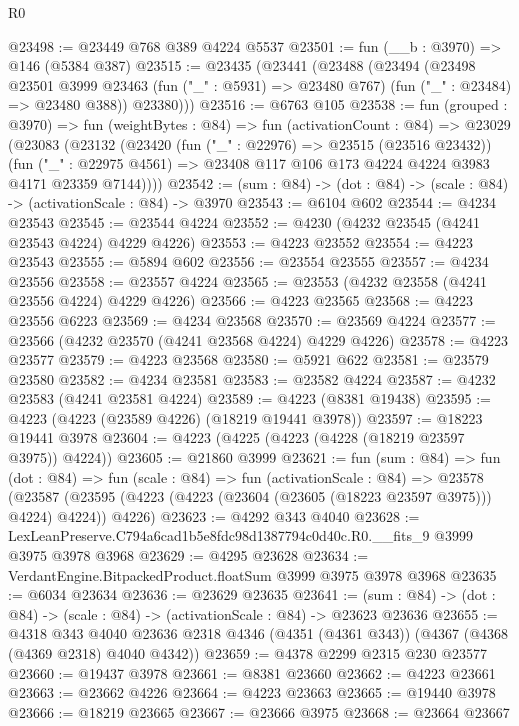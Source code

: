 \begin{lexlean}{R0}
\begin{coremodule}
@23498 := @23449 @768 @389 @4224 @5537
@23501 := fun (__b : @3970) => @146 (@5384 @387)
@23515 := @23435
    (@23441
      (@23488
        (@23494
          (@23498
            @23501
            @3999
            @23463
            (fun ("_" : @5931) => @23480 @767)
            (fun ("_" : @23484) => @23480 @388))
          @23380)))
@23516 := @6763 @105
@23538 := fun (grouped : @3970) =>
  fun (weightBytes : @84) =>
  fun (activationCount : @84) =>
  @23029
    (@23083
      (@23132
        (@23420
          (fun ("_" : @22976) => @23515 (@23516 @23432))
          (fun ("_" : @22975 @4561) =>
          @23408 @117 @106 @173 @4224 @4224 @3983 @4171 @23359 @7144))))
@23542 := (sum : @84) -> (dot : @84) -> (scale : @84) -> (activationScale : @84) -> @3970
@23543 := @6104 @602
@23544 := @4234 @23543
@23545 := @23544 @4224
@23552 := @4230 (@4232 @23545 (@4241 @23543 @4224) @4229 @4226)
@23553 := @4223 @23552
@23554 := @4223 @23543
@23555 := @5894 @602
@23556 := @23554 @23555
@23557 := @4234 @23556
@23558 := @23557 @4224
@23565 := @23553 (@4232 @23558 (@4241 @23556 @4224) @4229 @4226)
@23566 := @4223 @23565
@23568 := @4223 @23556 @6223
@23569 := @4234 @23568
@23570 := @23569 @4224
@23577 := @23566 (@4232 @23570 (@4241 @23568 @4224) @4229 @4226)
@23578 := @4223 @23577
@23579 := @4223 @23568
@23580 := @5921 @622
@23581 := @23579 @23580
@23582 := @4234 @23581
@23583 := @23582 @4224
@23587 := @4232 @23583 (@4241 @23581 @4224)
@23589 := @4223 (@8381 @19438)
@23595 := @4223 (@4223 (@23589 @4226) (@18219 @19441 @3978))
@23597 := @18223 @19441 @3978
@23604 := @4223 (@4225 (@4223 (@4228 (@18219 @23597 @3975)) @4224))
@23605 := @21860 @3999
@23621 := fun (sum : @84) =>
  fun (dot : @84) =>
  fun (scale : @84) =>
  fun (activationScale : @84) =>
  @23578 (@23587 (@23595 (@4223 (@4223 (@23604 (@23605 (@18223 @23597 @3975))) @4224) @4224)) @4226)
@23623 := @4292 @343 @4040
@23628 := LexLeanPreserve.C794a6cad1b5e8fdc98d1387794c0d40c.R0.__fits_9 @3999 @3975 @3978 @3968
@23629 := @4295 @23628
@23634 := VerdantEngine.BitpackedProduct.floatSum @3999 @3975 @3978 @3968
@23635 := @6034 @23634
@23636 := @23629 @23635
@23641 := (sum : @84) -> (dot : @84) -> (scale : @84) -> (activationScale : @84) -> @23623 @23636
@23655 := @4318
    @343
    @4040
    @23636
    @2318
    @4346
    (@4351 (@4361 @343))
    (@4367 (@4368 (@4369 @2318) @4040 @4342))
@23659 := @4378 @2299 @2315 @230 @23577
@23660 := @19437 @3978
@23661 := @8381 @23660
@23662 := @4223 @23661
@23663 := @23662 @4226
@23664 := @4223 @23663
@23665 := @19440 @3978
@23666 := @18219 @23665
@23667 := @23666 @3975
@23668 := @23664 @23667

\end{coremodule}
\end{lexlean}
